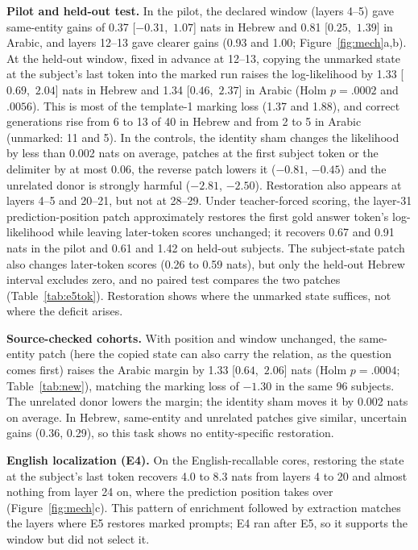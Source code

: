 \documentclass[11pt]{article}
\newcommand{\ci}[2]{\mbox{[$#1$, $#2$]}}
\begin{document}
\textbf{Pilot and held-out test.} In the pilot, the declared window (layers
4--5) gave same-entity gains of 0.37 \ci{-0.31}{1.07} nats in Hebrew and 0.81
\ci{0.25}{1.39} in Arabic, and layers 12--13 gave clearer gains (0.93 and 1.00;
Figure~\ref{fig:mech}a,b). At the held-out window, fixed in advance at 12--13,
copying the unmarked state at the subject's last token into the marked run raises the log-likelihood by 1.33 \ci{0.69}{2.04} nats in Hebrew and 1.34 \ci{0.46}{2.37}
in Arabic (Holm $p=.0002$ and $.0056$). This is most of the template-1 marking
loss (1.37 and 1.88), and correct generations rise from 6 to 13 of 40 in Hebrew
and from 2 to 5 in Arabic (unmarked: 11 and 5). In the controls, the identity
sham changes the likelihood by less than 0.002 nats on average,
patches at the first subject token or the delimiter by at most 0.06, the reverse
patch lowers it ($-0.81$, $-0.45$) and the unrelated donor is strongly harmful
($-2.81$, $-2.50$). Restoration also appears at layers 4--5 and 20--21, but not at 28--29.
Under teacher-forced scoring, the layer-31 prediction-position patch approximately
restores the first gold answer token's log-likelihood while leaving later-token
scores unchanged; it recovers 0.67 and 0.91 nats in the pilot and 0.61 and 1.42
on held-out subjects. The subject-state patch also changes later-token scores
(0.26 to 0.59 nats), but only the held-out Hebrew interval excludes zero, and no
paired test compares the two patches (Table~\ref{tab:e5tok}). Restoration shows where the unmarked state suffices, not
where the deficit arises.

\textbf{Source-checked cohorts.} With position and window unchanged, the
same-entity patch (here the copied state can also carry the relation, as the
question comes first) raises the Arabic margin by 1.33 \ci{0.64}{2.06} nats (Holm
$p=.0004$; Table~\ref{tab:new}), matching the marking loss of $-1.30$ in the
same 96 subjects. The unrelated donor lowers the margin; the identity sham
moves it by 0.002 nats on average. In Hebrew, same-entity and unrelated patches give similar, uncertain gains (0.36, 0.29), so this
task shows no entity-specific restoration.

\textbf{English localization (E4).} On the English-recallable cores, restoring the state at the subject's last token recovers 4.0 to 8.3 nats from layers 4 to 20
and almost nothing from layer 24 on, where
the prediction position takes over (Figure~\ref{fig:mech}c). This pattern of enrichment followed by extraction \citep{meng-etal-2022-locating,geva-etal-2023-dissecting} matches the layers where E5 restores marked prompts; E4 ran after E5, so
it supports the window but did not select it.
\end{document}
